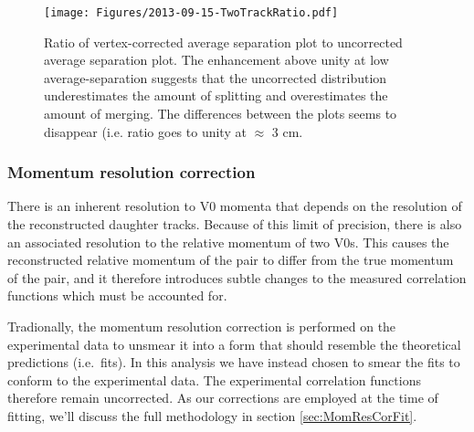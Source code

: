 \begin{figure}[hbtp]
\texttt{[image: Figures/2013-09-15-TwoTrackRatio.pdf]}
\caption[Ratio of corrected/uncorrected average-separation distributions]{Ratio of vertex-corrected average separation plot to uncorrected average separation plot.  
The enhancement above unity at low average-separation suggests that the uncorrected distribution underestimates the amount of splitting and overestimates the amount of merging. 
The differences between the plots seems to disappear (i.e. ratio goes to unity at $\approx$ 3 cm.}
\label{fig:TwoTrackRatio}
\end{figure}

\subsubsection{Momentum resolution correction}
\label{sec:MomentumResCorrectionCF}

There is an inherent resolution to V0 momenta that depends on the resolution of the reconstructed daughter tracks.  
Because of this limit of precision, there is also an associated resolution to the relative momentum of two V0s.
This causes the reconstructed relative momentum of the pair to differ from the true momentum of the pair, and it therefore introduces subtle changes to the measured correlation functions which must be accounted for.

Tradionally, the momentum resolution correction is performed on the experimental data to unsmear it into a form that should resemble the theoretical predictions (i.e.\ fits). 
In this analysis we have instead chosen to smear the fits to conform to the experimental data. 
The experimental correlation functions therefore remain uncorrected. 
As our corrections are employed at the time of fitting, we'll discuss the full methodology in section \ref{sec:MomResCorFit}.